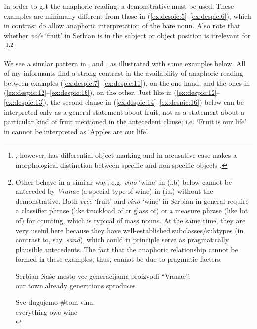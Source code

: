 \documentclass[output=paper,
modfonts
]{langscibook}
\begin{document}
	In order to get the anaphoric reading, a demonstrative must be used. These examples are minimally different from those in (\ref{ex:despic:5}--\ref{ex:despic:6}), which in contrast do allow anaphoric interpretation of the bare noun. Also note that whether \textit{vo\'ce} `fruit' in Serbian is in the subject or object position is irrelevant for .\footnote{, however, has differential object marking and in accusative case makes a morphological distinction between specific and non-specific objects \citep[e.g.][]{Enc1991}.}\textsuperscript{,}\footnote{Other  behave in a similar way; e.g. \textit{vino} `wine' in (i.b) below cannot be anteceded by \textit{Vranac} (a special type of wine) in (i.a) without the demonstrative. Both \textit{vo\'ce} `fruit' and \textit{vino} `wine' in Serbian in general require a classifier phrase (like truckload of  or glass of) or a measure phrase (like lot of) for counting, which is typical of mass nouns. At the same time, they are very useful here because they have well-established subclasses/subtypes (in contrast to, say, \textit{sand}), which could in principle serve as pragmatically plausible antecedents. The fact that the anaphoric relationship cannot be formed in these examples, thus, cannot be due to pragmatic factors.
		
		\ea \label{ex:despic:n5}
		\textnormal{Serbian}
		\ea \label{ex:despic:n5a}
		\gll 
		{Na\v se} {mesto} {ve\'c} {generacijama} {proizvodi} {``Vranac''}. \\
		{our} {town} {already} {generations} s{produces} \phantom{``}{Vranac} \\
		
		\ex  \label{ex:despic:n5b}
		\gll 
		{Sve} {dugujemo} \textnormal{\#}{\op}tom{\cp} {vinu}. \\   
		{everything} {owe}  {wine} \\
		\z
		\z 
	}
	
We see a similar pattern in ,  and , as illustrated with some examples below. All of my informants find a strong contrast in the availability of anaphoric reading between examples (\ref{ex:despic:7}--\ref{ex:despic:11}), on the one hand, and the ones in (\ref{ex:despic:12}--\ref{ex:despic:16}), on the other. Just like in (\ref{ex:despic:12}--\ref{ex:despic:13}), the second clause in (\ref{ex:despic:14}--\ref{ex:despic:16}) below can be interpreted only as a general statement about fruit, not as a statement about a particular kind of fruit mentioned in the antecedent clause; i.e. `Fruit is our life' in  cannot be interpreted as `Apples are our life'.
	
\end{document}
